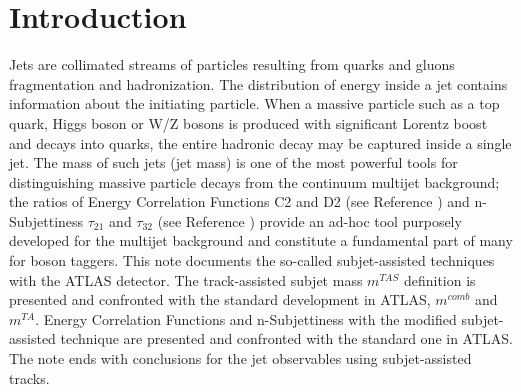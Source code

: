 \documentclass[UKenglish,texlive=2013]{\ATLASLATEXPATH atlasdoc}
\begin{document}
\maketitle

\tableofcontents

\newpage

\section{Introduction}
\label{sec:intro}



Jets are collimated streams of particles resulting from quarks and gluons fragmentation and hadronization.
The distribution of energy inside a jet contains information about the initiating particle. When a massive
particle such as a top quark, Higgs boson or W/Z bosons is produced with significant Lorentz boost and decays into
quarks, the entire hadronic decay may be captured inside a single jet. The mass of such jets (jet mass)
is one of the most powerful tools for distinguishing massive particle decays from the continuum multijet
background; the ratios of Energy Correlation Functions C2 and D2 (see Reference \cite{bib:ECF}) and n-Subjettiness $\tau_{21}$ and $\tau_{32}$ (see Reference \cite{bib:nsub}) provide an ad-hoc tool purposely developed for the multijet background and constitute a fundamental part of many for boson taggers.
This note documents the so-called subjet-assisted techniques with the ATLAS detector. 
The track-assisted subjet mass $m^{TAS}$ definition is presented and confronted with the standard development in ATLAS, $m^{comb}$ and $m^{TA}$. 
Energy Correlation Functions and n-Subjettiness with the modified subjet-assisted technique are presented and confronted with the standard one in ATLAS.
The note ends with conclusions for the jet observables using subjet-assisted tracks.


\end{document}
